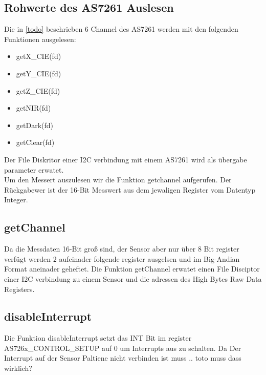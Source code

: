 \subsection{Rohwerte des AS7261 Auslesen}
Die in \ref{todo} beschrieben 6 Channel des AS7261 werden mit den folgenden Funktionen ausgelesen:
\begin{itemize}
	\item getX\_CIE(fd)
	\item getY\_CIE(fd)
	\item getZ\_CIE(fd)
	\item getNIR(fd)
	\item getDark(fd) 
	\item getClear(fd)
\end{itemize}
Der File Diskritor einer I2C verbindung mit einem AS7261 wird als übergabe parameter erwatet.\\
Um den Messert auszulesen wir die Funktion getchannel aufgerufen.
Der Rückgabewer ist der 16-Bit Messwert aus dem jewaligen Register vom Datentyp Integer.

\subsection{getChannel}
Da die Messdaten 16-Bit groß sind, der Sensor aber nur über 8 Bit register verfügt werden 2 aufeinader folgende register ausgelsen und im Big-Andian Format aneinader geheftet.
Die Funktion getChannel erwatet einen File Disciptor einer I2C verbindung zu einem Sensor und die adressen des High Bytes Raw Data Registers.

\subsection{disableInterrupt}
Die Funktion disableInterrupt setzt das INT Bit im register AS726x\_CONTROL\_SETUP auf 0 um Interrupts aus zu schalten.
Da Der Interrupt auf der Sensor Paltiene nicht verbinden ist muss .. toto muss dass wirklich?


